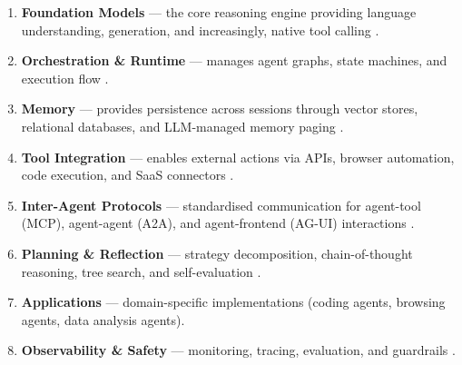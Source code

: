 \documentclass[review]{elsarticle}
\theoremstyle{definition}
\begin{document}
\begin{enumerate}
    \item[\textbf{L1.}] \textbf{Foundation Models} --- the core reasoning engine providing language understanding, generation, and increasingly, native tool calling \citep{openai2024gpt4o,anthropic2024claude,team2023gemini}.
    \item[\textbf{L2.}] \textbf{Orchestration \& Runtime} --- manages agent graphs, state machines, and execution flow \citep{langchain2024langgraph,wu2023autogen,hong2023metagpt}.
    \item[\textbf{L3.}] \textbf{Memory} --- provides persistence across sessions through vector stores, relational databases, and LLM-managed memory paging \citep{packer2023memgpt,lewis2020retrieval}.
    \item[\textbf{L4.}] \textbf{Tool Integration} --- enables external actions via APIs, browser automation, code execution, and SaaS connectors \citep{schick2024toolformer,patil2023gorilla}.
    \item[\textbf{L5.}] \textbf{Inter-Agent Protocols} --- standardised communication for agent-tool (MCP), agent-agent (A2A), and agent-frontend (AG-UI) interactions \citep{anthropic2024mcp,google2024a2a,copilotkit2024agui}.
    \item[\textbf{L6.}] \textbf{Planning \& Reflection} --- strategy decomposition, chain-of-thought reasoning, tree search, and self-evaluation \citep{wei2022chain,yao2024tree,shinn2023reflexion}.
    \item[\textbf{L7.}] \textbf{Applications} --- domain-specific implementations (coding agents, browsing agents, data analysis agents).
    \item[\textbf{L8.}] \textbf{Observability \& Safety} --- monitoring, tracing, evaluation, and guardrails \citep{langfuse2024,guardrailsai2024}.
\end{enumerate}
\end{document}
